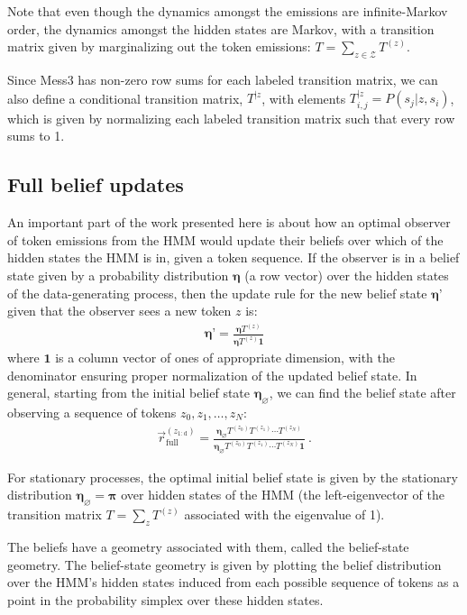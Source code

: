 \documentclass{article}
\theoremstyle{plain}
\theoremstyle{definition}
\theoremstyle{remark}
\newcommand{\stationary}{\boldsymbol{\pi}}
\newcommand{\Abet}{\mathcal{Z}}
\begin{document}
Note that even though the dynamics amongst the emissions are infinite-Markov order, the dynamics amongst the hidden states are Markov, with a transition matrix given by marginalizing out the token emissions: $T=\sum_{z\in\Abet}T^{(z)}$.

Since Mess3 has non-zero row sums for each labeled transition matrix,
we can also define a conditional transition matrix, $T^{|z}$, with elements $T^{|z}_{i,j} = P(s_j|z,s_i)$, which is given by normalizing each labeled transition matrix such that every row sums to 1.


\subsection{Full belief updates}

An important part of the work presented here is about how an optimal observer of token emissions from the HMM would update their beliefs over which of the hidden states the HMM is in, given a token sequence.
If the observer is in a belief state given by a probability distribution $\boldsymbol{\eta}$ (a row vector) over the hidden states of the data-generating process, then the update rule for the new belief state $\boldsymbol{\eta}’$ given that the observer sees a new token $z$ is:
\begin{align}
	\boldsymbol{\eta}’ = \frac{\boldsymbol{\eta} T^{(z)}}{\boldsymbol{\eta} T^{(z)} \mathbf{1}}
	\label{eq:ms_update}
\end{align}
where $\mathbf{1}$ is a column vector of ones of appropriate dimension, with the denominator ensuring proper normalization of the updated belief state. In general, starting from the initial belief state $\boldsymbol{\eta}_\varnothing$, we can find the belief state after observing a sequence of tokens $z_0, z_1, \dots , z_N$:
\begin{align}
	\vec{r}_\text{full}^{(z_{1:\text{d}})} 
	= \frac{\boldsymbol{\eta}_\varnothing T^{(z_0)} T^{(z_1)} \cdots T^{(z_N)}}{\boldsymbol{\eta}_\varnothing T^{(z_0)} T^{(z_1)} \cdots T^{(z_N)} \mathbf{1}} ~.
\end{align}

For stationary processes, the optimal initial belief state is given by the stationary distribution $\boldsymbol{\eta}_\varnothing = \stationary$ over hidden states of the HMM (the left-eigenvector of the transition matrix $T=\sum_z T^{(z)}$ associated with the eigenvalue of 1). 

The beliefs have a geometry associated with them, called the belief-state geometry. 
The belief-state geometry is given by plotting the belief distribution
over the HMM's hidden states
induced from each possible sequence of tokens
as a point in the probability simplex over these hidden states.
\end{document}
